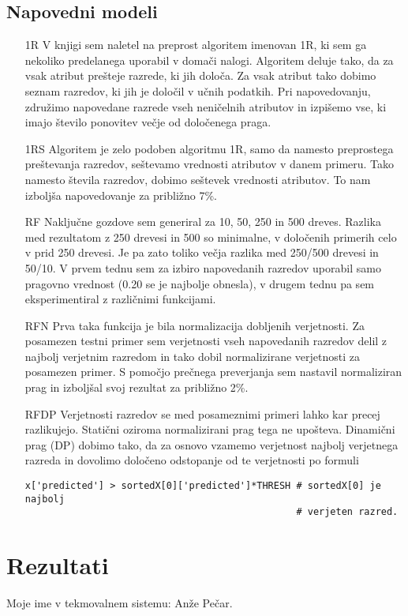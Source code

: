 \documentclass[a4paper,11pt]{article}
\begin{document}
\subsection{Napovedni modeli}
\begin{itemize}
\item[1R] V knjigi \cite{mining} sem naletel na preprost algoritem imenovan 1R, ki sem ga nekoliko predelanega uporabil v domači nalogi. Algoritem deluje tako, da za vsak atribut prešteje razrede, ki jih določa. Za vsak atribut tako dobimo seznam razredov, ki jih je določil v učnih podatkih. Pri napovedovanju, združimo napovedane razrede vseh neničelnih atributov in izpišemo vse, ki imajo število ponovitev večje od določenega praga.
\item[1RS] Algoritem je zelo podoben algoritmu 1R, samo da namesto preprostega preštevanja razredov, seštevamo vrednosti atributov v danem primeru. Tako namesto števila razredov, dobimo seštevek vrednosti atributov. To nam izboljša napovedovanje za približno 7\%.
\item[RF] Naključne gozdove sem generiral za 10, 50, 250 in 500 dreves. Razlika med rezultatom z 250 drevesi in 500 so minimalne, v določenih primerih celo v prid 250 drevesi. Je pa zato toliko večja razlika med 250/500 drevesi in 50/10. V prvem tednu sem za izbiro napovedanih razredov uporabil samo pragovno vrednost (0.20 se je najbolje obnesla), v drugem tednu pa sem eksperimentiral z različnimi funkcijami.
\item[RFN] Prva taka funkcija je bila normalizacija dobljenih verjetnosti. Za posamezen testni primer sem verjetnosti vseh napovedanih razredov delil z najbolj verjetnim razredom in tako dobil normalizirane verjetnosti za posamezen primer. S pomočjo prečnega preverjanja sem nastavil normaliziran prag in izboljšal svoj rezultat za približno 2\%.
\item[RFDP] Verjetnosti razredov se med posameznimi primeri lahko kar precej razlikujejo. Statični oziroma normalizirani prag tega ne upošteva. Dinamični prag (DP) dobimo tako, da za osnovo vzamemo verjetnost najbolj verjetnega razreda in dovolimo določeno odstopanje od te verjetnosti po formuli 
\begin{verbatim}
x['predicted'] > sortedX[0]['predicted']*THRESH # sortedX[0] je najbolj 
                                                # verjeten razred.
\end{verbatim} 
\end{itemize}
\section{Rezultati}
Moje ime v tekmovalnem sistemu: Anže Pečar.
\end{document}
